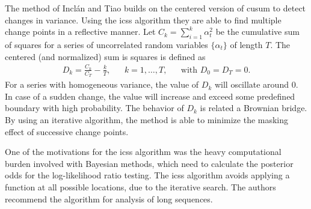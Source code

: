 The method of Incl\'{a}n and Tiao \cite{inclan1994use} builds on the centered version of \gls{cusum} \cite{brown1975techniques} to detect changes in variance.
Using the \gls{icss} algorithm they are able to find multiple change points in a reflective manner.
Let $C_k = \sum_{i=1}^k \alpha_t^2$ be the cumulative sum of squares for a series of uncorrelated random variables $\{\alpha_t\}$ of length $T$.
The centered (and normalized) sum is squares is defined as
\begin{equation}
  \begin{aligned}
  D_k = \frac{C_k}{C_T} - \frac{k}{T}, & & k = 1, \dots, T, & & \text{with } D_0 = D_T = 0.
  \end{aligned}
\end{equation}
For a series with homogeneous variance, the value of $D_k$ will oscillate around $0$.
In case of a sudden change, the value will increase and exceed some predefined boundary with high probability.
The behavior of $D_k$ is related a Brownian bridge.
By using an iterative algorithm, the method is able to minimize the masking effect of successive change points.

One of the motivations for the \gls{icss} algorithm was the heavy computational burden involved with Bayesian methods, which need to calculate the posterior odds for the log-likelihood ratio testing.
The \gls{icss} algorithm avoids applying a function at all possible locations, due to the iterative search.
The authors recommend the algorithm for analysis of long sequences.